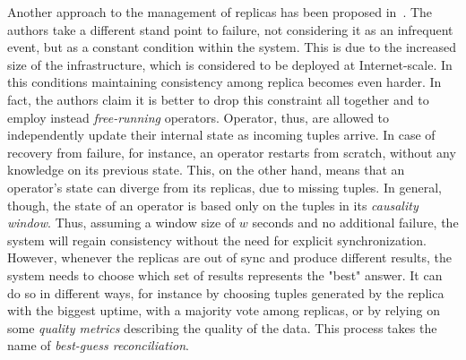 Another approach to the management of replicas has been proposed in~\cite{dependable-is-sensing}. The authors take a
different stand point to failure, not considering it as an infrequent event, but as a constant condition within the
system. This is due to the increased size of the infrastructure, which is considered to be deployed at Internet-scale. In this
conditions maintaining consistency among replica becomes even harder. In fact, the authors claim it is better to drop
this constraint all together and to employ instead \textit{free-running} operators. Operator, thus, are allowed to
independently update their internal state as incoming tuples arrive. In case of recovery from failure, for instance, an
operator restarts from scratch, without any knowledge on its previous state. This, on the other hand, means that an
operator's state can diverge from its replicas, due to missing tuples. In general, though, the state of an operator is
based only on the tuples in its \textit{causality window}. Thus, assuming a window size of $w$ seconds and no additional failure, 
the system will regain consistency without the need for explicit synchronization. However, whenever the replicas are out
of sync and produce different results, the system needs to choose which set of results represents the "best" answer.
It can do so in different ways, for instance by choosing tuples generated by the replica with the biggest uptime, with a
majority vote among replicas, or by relying on some \textit{quality metrics} describing the quality of the data. This
process takes the name of \textit{best-guess reconciliation}.

\begin{comment}
\subsection{Query Optimization}

\begin{structure}
	\item Why do we reuse streams? - true scalability
	\item How to reuse streams? - cosmos approach
\end{structure}

COSMOS

\end{comment}

